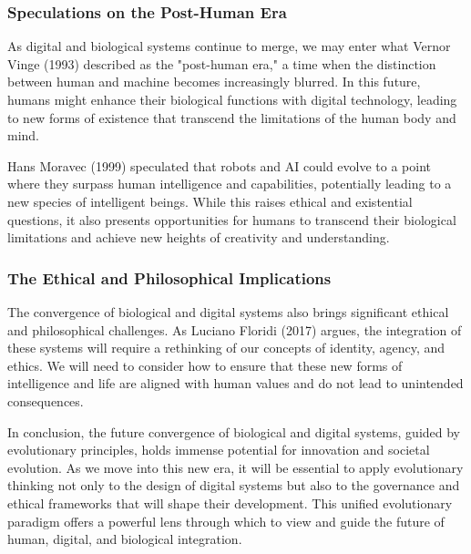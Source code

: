 \documentclass[12pt,twoside]{article}
\begin{document}
\subsubsection{Speculations on the Post-Human Era}

As digital and biological systems continue to merge, we may enter what Vernor Vinge (1993) described as the "post-human era," a time when the distinction between human and machine becomes increasingly blurred. In this future, humans might enhance their biological functions with digital technology, leading to new forms of existence that transcend the limitations of the human body and mind.

Hans Moravec (1999) speculated that robots and AI could evolve to a point where they surpass human intelligence and capabilities, potentially leading to a new species of intelligent beings. While this raises ethical and existential questions, it also presents opportunities for humans to transcend their biological limitations and achieve new heights of creativity and understanding.


\subsubsection{The Ethical and Philosophical Implications}

The convergence of biological and digital systems also brings significant ethical and philosophical challenges. As Luciano Floridi (2017) argues, the integration of these systems will require a rethinking of our concepts of identity, agency, and ethics. We will need to consider how to ensure that these new forms of intelligence and life are aligned with human values and do not lead to unintended consequences.

In conclusion, the future convergence of biological and digital systems, guided by evolutionary principles, holds immense potential for innovation and societal evolution. As we move into this new era, it will be essential to apply evolutionary thinking not only to the design of digital systems but also to the governance and ethical frameworks that will shape their development. This unified evolutionary paradigm offers a powerful lens through which to view and guide the future of human, digital, and biological integration.

\nocite{*}

\printbibliography
\end{document}
